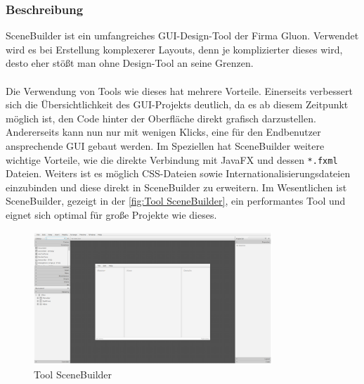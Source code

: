 \subsubsection{Beschreibung}
SceneBuilder ist ein umfangreiches GUI-Design-Tool der Firma Gluon.
Verwendet wird es bei Erstellung komplexerer Layouts, denn je komplizierter dieses wird, desto eher stößt man ohne Design-Tool an seine Grenzen.\\\\
Die Verwendung von Tools wie dieses hat mehrere Vorteile.
Einerseits verbessert sich die Übersichtlichkeit des GUI-Projekts deutlich, da es ab diesem Zeitpunkt möglich ist, den Code hinter der Oberfläche direkt grafisch darzustellen.
Andererseits kann nun nur mit wenigen Klicks, eine für den Endbenutzer ansprechende GUI gebaut werden.
Im Speziellen hat SceneBuilder weitere wichtige Vorteile, wie die direkte Verbindung mit JavaFX und dessen \lstinline{*.fxml} Dateien.
Weiters ist es möglich \acs{CSS}-Dateien sowie Internationalisierungsdateien einzubinden und diese direkt in SceneBuilder zu erweitern.
Im Wesentlichen ist SceneBuilder, gezeigt in der \autoref{fig:Tool SceneBuilder}, ein performantes Tool und eignet sich optimal für große Projekte wie dieses.
\begin{figure}[H]
    \centering
    \includegraphics[width=0.8\textwidth]{fig/ainf/SceneBuilder.png}
    \caption{Tool SceneBuilder}
    \label{fig:Tool SceneBuilder}
\end{figure}
